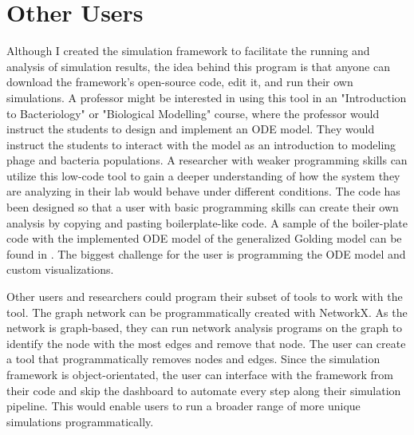 \section{Other Users}
Although I created the simulation framework to facilitate the running and analysis of simulation results, the idea behind this program is that anyone can download the framework's open-source code, edit it, and run their own simulations. 
A professor might be interested in using this tool in an "Introduction to Bacteriology" or "Biological Modelling" course, where the professor would instruct the students to design and implement an ODE model. 
They would instruct the students to interact with the model as an introduction to modeling phage and bacteria populations. 
A researcher with weaker programming skills can utilize this low-code tool to gain a deeper understanding of how the system they are analyzing in their lab would behave under different conditions. 
The code has been designed so that a user with basic programming skills can create their own analysis by copying and pasting boilerplate-like code. 
A sample of the boiler-plate code with the implemented ODE model of the generalized Golding model can be found in . 
The biggest challenge for the user is programming the ODE model and custom visualizations. 

Other users and researchers could program their subset of tools to work with the tool. 
The graph network can be programmatically created with NetworkX. 
As the network is graph-based, they can run network analysis programs on the graph to identify the node with the most edges and remove that node. 
The user can create a tool that programmatically removes nodes and edges. 
Since the simulation framework is object-orientated, the user can interface with the framework from their code and skip the dashboard to automate every step along their simulation pipeline. 
This would enable users to run a broader range of more unique simulations programmatically. 